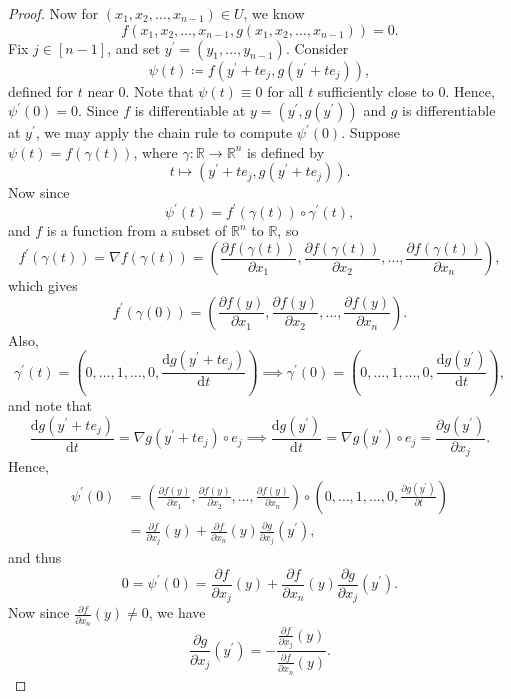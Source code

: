 \begin{proof}
    Now for \((x_1, x_2, \dots , x_{n-1}) \in U\), we know
    \[
        f(x_1, x_2, \dots , x_{n-1}, g(x_1, x_2, \dots , x_{n-1})) = 0.
    \] 
    Fix \(j \in [n - 1]\), and set \(y^{\prime} = (y_1, \dots , y_{n-1})\). Consider 
    \[
        \psi (t) \coloneqq f(y^{\prime} + te_j, g(y^{\prime} + te_j)),
    \]  
    defined for \(t\) near \(0\). Note that \(\psi (t) \equiv 0\) for all \(t\) sufficiently close to \(0\). Hence, \(\psi ^{\prime} (0) = 0\). Since \(f\) is differentiable at \(y = (y^{\prime} , g(y^{\prime} ))\) and \(g\) is differentiable at \(y^{\prime} \), we may apply the chain rule to compute \(\psi ^{\prime} (0)\). Suppose \(\psi (t) = f(\gamma (t))\), where \(\gamma : \mathbb{R} \to \mathbb{R} ^n\) is defined by 
    \[
        t \mapsto (y^{\prime} + te_j, g(y^{\prime} + te_j)).
    \]   
    Now since
    \[
        \psi ^{\prime} (t) = f^{\prime} (\gamma (t)) \circ \gamma ^{\prime} (t),
    \]
    and \(f\) is a function from a subset of \(\mathbb{R} ^n\) to \(\mathbb{R} \), so
    \[
        f^{\prime} (\gamma (t)) = \nabla f(\gamma (t)) = \left( \frac{\partial f(\gamma (t))}{\partial x_1}, \frac{\partial f(\gamma (t))}{\partial x_2}, \dots , \frac{\partial f(\gamma (t))}{\partial x_n}  \right), 
    \]    
    which gives
    \[
        f^{\prime} (\gamma (0)) = \left( \frac{\partial f(y)}{\partial x_1}, \frac{\partial f(y)}{\partial x_2}, \dots , \frac{\partial f(y)}{\partial x_n}  \right). 
    \]
    Also, 
    \[
        \gamma ^{\prime} (t) = \left( 0, \dots , 1, \dots , 0, \frac{\mathrm{d} g(y^{\prime}  + te_j)}{\mathrm{d}t} \right) \implies \gamma ^{\prime} (0) = \left( 0, \dots , 1, \dots , 0, \frac{\mathrm{d} g(y^{\prime})}{\mathrm{d}t} \right), 
    \]
    and note that 
    \[
       \frac{\mathrm{d} g(y^{\prime}  + te_j)}{\mathrm{d}t} = \nabla g(y^{\prime} + te_j) \circ e_j \implies \frac{\mathrm{d} g(y^{\prime} )}{\mathrm{d}t} = \nabla g(y^{\prime} ) \circ e_j = \frac{\partial g(y^{\prime} )}{\partial x_j}.   
    \]
    Hence, 
    \begin{align*}
        \psi ^{\prime} (0) &=  \left( \frac{\partial f(y)}{\partial x_1}, \frac{\partial f(y)}{\partial x_2}, \dots , \frac{\partial f(y)}{\partial x_n}  \right) \circ \left( 0, \dots , 1, \dots , 0, \frac{\partial g(y^{\prime} )}{\partial t}  \right) \\
        &= \frac{\partial f}{\partial x_j}(y) + \frac{\partial f}{\partial x_n}(y) \frac{\partial g}{\partial x_j}(y^{\prime} ),
    \end{align*}        
    and thus 
    \[
       0 = \psi ^{\prime} (0) = \frac{\partial f}{\partial x_j}(y) + \frac{\partial f}{\partial x_n}(y) \frac{\partial g}{\partial x_j}(y^{\prime} ). 
    \]
    Now since \(\frac{\partial f}{\partial x_n}(y) \neq 0 \), we have 
    \[
        \frac{\partial g}{\partial x_j}(y^{\prime} ) = -\frac{\frac{\partial f}{\partial x_j}(y) }{\frac{\partial f}{\partial x_n}(y) }. 
    \]  
\end{proof}

